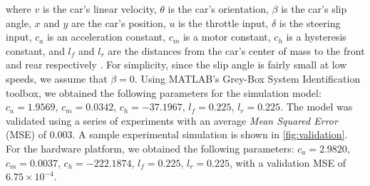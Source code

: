 \documentclass[manuscript,screen,review]{acmart}
\begin{document}
\noindent where $v$ is the car's linear velocity, $\theta$ is the car's orientation, $\beta$ is the car's slip angle, $x$ and $y$ are the car's position, $u$ is the throttle input, $\delta$ is the steering input, $c_a$ is an acceleration constant, $c_m$ is a motor constant, $c_h$ is a hysteresis constant, and $l_f$ and $l_r$ are the distances from the car's center of mass to the front and rear respectively \cite{ivanov2020case}. For simplicity, since the slip angle is fairly small at low speeds, we assume that $\beta = 0$.
Using MATLAB's Grey-Box System Identification toolbox, we obtained the following parameters for the simulation model: $c_a = 1.9569$, $c_m = 0.0342$, $c_h = -37.1967$, $l_f =0.225$, $l_r = 0.225$. The model was validated using a series of experiments %
with an average \emph{Mean Squared Error} (MSE) of $0.003$. A sample experimental simulation is shown in \ref{fig:validation}. For the hardware platform, we obtained the following parameters: $c_a = 2.9820$, $c_m = 0.0037$, $c_h = -222.1874$, $l_f =0.225$, $l_r = 0.225$, with a validation MSE of $6.75 \times 10^{-4}$.


\end{document}
